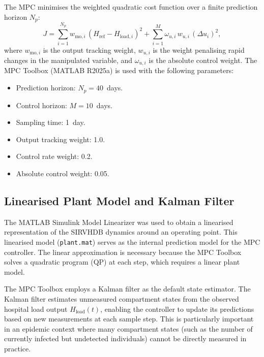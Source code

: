 The MPC minimises the weighted quadratic cost function over a finite prediction horizon $N_p$:
\begin{equation}
  J = \sum_{i=1}^{N_p} w_{\mathrm{mo},i}\,(H_{\mathrm{ref}} - H_{\mathrm{load},i})^2 + \sum_{i=1}^{M} \omega_{u,i}\,w_{u,i}\,(\Delta u_i)^2,
  \label{eq:mpc_cost}
\end{equation}
where $w_{\mathrm{mo},i}$ is the output tracking weight, $w_{u,i}$ is the weight penalising rapid changes in the manipulated variable, and $\omega_{u,i}$ is the absolute control weight.
The MPC Toolbox (MATLAB R2025a) is used with the following parameters:
\begin{itemize}
  \item Prediction horizon: $N_p = 40$~days.
  \item Control horizon: $M = 10$~days.
  \item Sampling time: 1~day.
  \item Output tracking weight: 1.0.
  \item Control rate weight: 0.2.
  \item Absolute control weight: 0.05.
\end{itemize}

\subsection{Linearised Plant Model and Kalman Filter}
\label{sec:kalman}

The MATLAB Simulink Model Linearizer was used to obtain a linearised representation of the SIRVHDB dynamics around an operating point.
This linearised model (\texttt{plant.mat}) serves as the internal prediction model for the MPC controller.
The linear approximation is necessary because the MPC Toolbox solves a quadratic program (QP) at each step, which requires a linear plant model.

The MPC Toolbox employs a Kalman filter as the default state estimator.
The Kalman filter estimates unmeasured compartment states from the observed hospital load output $H_{\mathrm{load}}(t)$, enabling the controller to update its predictions based on new measurements at each sample step.
This is particularly important in an epidemic context where many compartment states (such as the number of currently infected but undetected individuals) cannot be directly measured in practice.
